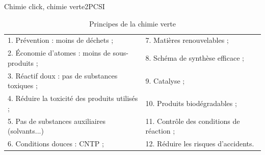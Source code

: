 \begin{exercise}{Chimie click, chimie verte}{2}{PCSI}
\begin{questions}
    \begin{table}[H]
        \centering
        \begin{tabular}{ll}
            \\\hline\hline
            1. Prévention : moins de déchets ; &
            7. Matières renouvelables  ;\\
            2. Économie d'atomes : moins de sous-produits ; &
            8. Schéma de synthèse efficace ;\\
            3. Réactif doux : pas de substances toxiques ; &
            9. Catalyse ;\\
            4. Réduire la toxicité des produits utilisés ; &
            10. Produits biodégradables ;\\
            5. Pas de substances auxiliaires (solvants...) &
            11. Contrôle des conditions de réaction ; \\
            6. Conditions douces : CNTP ; &
            12. Réduire les risques d'accidents. \\ \hline
        \end{tabular}
        \caption{Principes de la chimie verte}
    \end{table}
\end{questions}
\end{exercise}